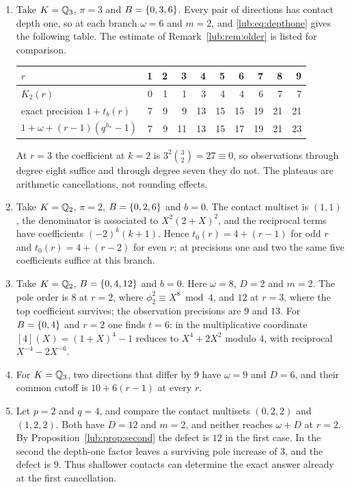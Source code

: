 \begin{example}\label{lub:ex:poles}
\begin{enumerate}[label=\textup{(\arabic*)}]
\item Take $K=\mathbb{Q}_3$, $\pi=3$ and $B=\{0,3,6\}$. Every pair of directions has contact
depth one, so at each branch $\omega=6$ and $m=2$, and \eqref{lub:eq:depthone} gives the
following table. The estimate of Remark~\ref{lub:rem:older} is listed for comparison.
\begin{center}\small
\begin{tabular}{l|rrrrrrrrr}
\toprule
$r$ &1&2&3&4&5&6&7&8&9\\
\midrule
$K_2(r)$ &0&1&1&3&4&4&6&7&7\\
exact precision $1+t_b(r)$ &7&9&9&13&15&15&19&21&21\\
$1+\omega+(r-1)(q^{h_*}-1)$ &7&9&11&13&15&17&19&21&23\\
\bottomrule
\end{tabular}
\end{center}
At $r=3$ the coefficient at $k=2$ is $3^2\binom32=27\equiv0$, so observations through
degree eight suffice and through degree seven they do not. The plateaus are arithmetic
cancellations, not rounding effects.
\item Take $K=\mathbb{Q}_2$, $\pi=2$, $B=\{0,2,6\}$ and $b=0$. The contact multiset is $(1,1)$,
the denominator is associated to $X^2(2+X)^2$, and the reciprocal terms have coefficients
$(-2)^k(k+1)$. Hence $t_0(r)=4+(r-1)$ for odd $r$ and $t_0(r)=4+(r-2)$ for even $r$; at
precisions one and two the same five coefficients suffice at this branch.
\item Take $K=\mathbb{Q}_2$, $B=\{0,4,12\}$ and $b=0$. Here $\omega=8$, $D=2$ and $m=2$. The pole
order is $8$ at $r=2$, where $\phi_2^2\equiv X^8\bmod4$, and $12$ at $r=3$, where the top
coefficient survives; the observation precisions are $9$ and $13$. For $B=\{0,4\}$ and
$r=2$ one finds $t=6$: in the multiplicative coordinate $[4](X)=(1+X)^4-1$ reduces to
$X^4+2X^2$ modulo $4$, with reciprocal $X^{-4}-2X^{-6}$.
\item For $K=\mathbb{Q}_3$, two directions that differ by $9$ have $\omega=9$ and $D=6$, and their
common cutoff is $10+6(r-1)$ at every $r$.
\item Let $p=2$ and $q=4$, and compare the contact multisets $(0,2,2)$ and $(1,2,2)$. Both
have $D=12$ and $m=2$, and neither reaches $\omega+D$ at $r=2$. By
Proposition~\ref{lub:prop:second} the defect is $12$ in the first case. In the second the depth-one
factor leaves a surviving pole increase of $3$, and the defect is $9$. Thus shallower
contacts can determine the exact answer already at the first cancellation.
\end{enumerate}
\end{example}


